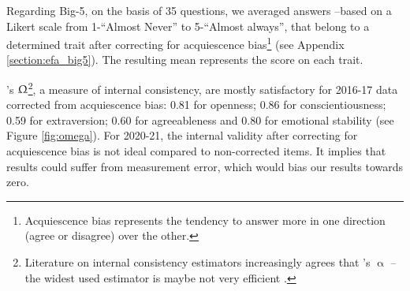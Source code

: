 \documentclass[a4paper, 11pt, onecolumn]{article}
\begin{document}
Regarding Big-5, on the basis of 35 questions, we averaged answers --based on a Likert scale from 1-``Almost Never'' to 5-``Almost always'', that belong to a determined trait after correcting for acquiescence bias\footnote{Acquiescence bias represents the tendency to answer more in one direction (agree or disagree) over the other.} (see Appendix \ref{section:efa_big5}).
The resulting mean represents the score on each trait.

\citeauthor{McDonald1999}'s $\Upomega$\footnote{Literature on internal consistency estimators increasingly agrees that \citeauthor{Cronbach1951}'s $\upalpha$ --the widest used estimator is maybe not very efficient \citep{Bourque2019, TrizanoHermosilla2016}.}, a measure of internal consistency, are mostly satisfactory for 2016-17 data corrected from acquiescence bias: 0.81 for openness; 0.86 for conscientiousness; 0.59 for extraversion; 0.60 for agreeableness and 0.80 for emotional stability (see Figure \ref{fig:omega}).
For 2020-21, the internal validity after correcting for acquiescence bias is not ideal compared to non-corrected items.
It implies that results could suffer from measurement error, which would bias our results towards zero.

\end{document}
